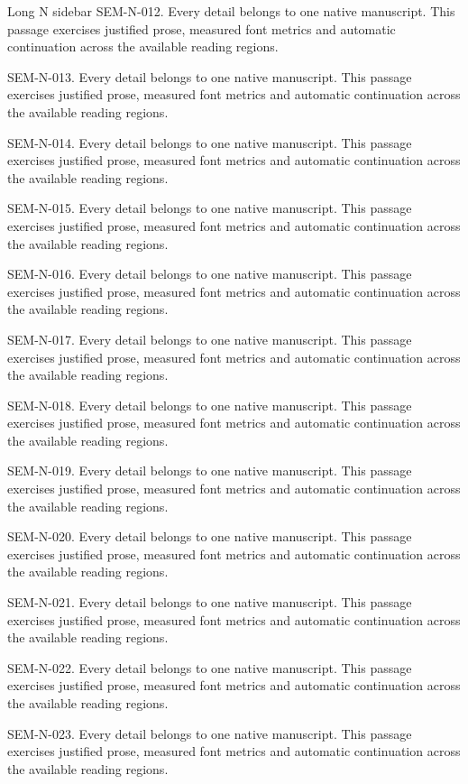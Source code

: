 \begin{m20sidebar}[id=long-narrow]{Long N sidebar}
SEM-N-012. Every detail belongs to one native manuscript. This passage exercises justified prose, measured font metrics and automatic continuation across the available reading regions.\par
SEM-N-013. Every detail belongs to one native manuscript. This passage exercises justified prose, measured font metrics and automatic continuation across the available reading regions.\par
SEM-N-014. Every detail belongs to one native manuscript. This passage exercises justified prose, measured font metrics and automatic continuation across the available reading regions.\par
SEM-N-015. Every detail belongs to one native manuscript. This passage exercises justified prose, measured font metrics and automatic continuation across the available reading regions.\par
SEM-N-016. Every detail belongs to one native manuscript. This passage exercises justified prose, measured font metrics and automatic continuation across the available reading regions.\par
SEM-N-017. Every detail belongs to one native manuscript. This passage exercises justified prose, measured font metrics and automatic continuation across the available reading regions.\par
SEM-N-018. Every detail belongs to one native manuscript. This passage exercises justified prose, measured font metrics and automatic continuation across the available reading regions.\par
SEM-N-019. Every detail belongs to one native manuscript. This passage exercises justified prose, measured font metrics and automatic continuation across the available reading regions.\par
SEM-N-020. Every detail belongs to one native manuscript. This passage exercises justified prose, measured font metrics and automatic continuation across the available reading regions.\par
SEM-N-021. Every detail belongs to one native manuscript. This passage exercises justified prose, measured font metrics and automatic continuation across the available reading regions.\par
SEM-N-022. Every detail belongs to one native manuscript. This passage exercises justified prose, measured font metrics and automatic continuation across the available reading regions.\par
SEM-N-023. Every detail belongs to one native manuscript. This passage exercises justified prose, measured font metrics and automatic continuation across the available reading regions.\par

\end{m20sidebar}
